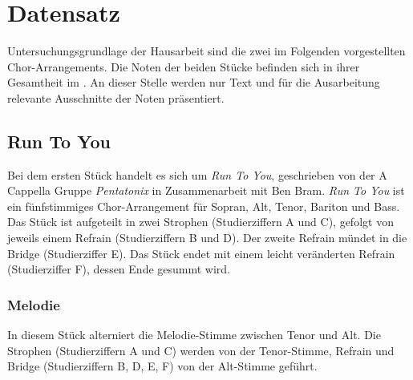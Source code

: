 \chapter{Datensatz}
\label{chap:Datensatz}
\pagestyle{plain}

Untersuchungsgrundlage der Hausarbeit sind die zwei im Folgenden vorgestellten Chor-Arrangements. Die Noten der beiden Stücke befinden sich in ihrer Gesamtheit im . An dieser Stelle werden nur Text und für die Ausarbeitung relevante Ausschnitte der Noten präsentiert.

\section{Run To You}

Bei dem ersten Stück handelt es sich um \textit{Run To You}, geschrieben von der A Cappella Gruppe \textit{Pentatonix} in Zusammenarbeit mit Ben Bram. \textit{Run To You} ist ein fünfstimmiges Chor-Arrangement für Sopran, Alt, Tenor, Bariton und Bass. Das Stück ist aufgeteilt in zwei Strophen (Studierziffern A und C), gefolgt von jeweils einem Refrain (Studierziffern B und D). Der zweite Refrain mündet in die Bridge (Studierziffer E). Das Stück endet mit einem leicht veränderten Refrain (Studierziffer F), dessen Ende gesummt wird.

\subsection*{Melodie}

In diesem Stück alterniert die Melodie-Stimme zwischen Tenor und Alt. Die Strophen (Studierziffern A und C) werden von der Tenor-Stimme, Refrain und Bridge (Studierziffern B, D, E, F) von der Alt-Stimme geführt.

